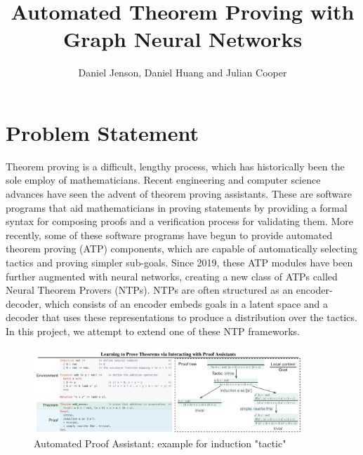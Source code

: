 \documentclass{article}
\title{%
    Automated Theorem Proving with Graph Neural Networks}
\author{Daniel Jenson, Daniel Huang and Julian Cooper}
\begin{document}
\maketitle



\vspace{-3em}
\section{Problem Statement}
Theorem proving is a difficult, lengthy process, which has historically been the sole employ of mathematicians. Recent engineering and computer science advances have seen the advent of theorem proving assistants. These are software programs that aid mathematicians in proving statements by providing a formal syntax for composing proofs and a verification process for validating them. More recently, some of these software programs have begun to provide automated theorem proving (ATP) components, which are capable of automatically selecting tactics and proving simpler sub-goals. Since 2019, these ATP modules have been further augmented with neural networks, creating a new class of ATPs called Neural Theorem Provers (NTPs). NTPs are often structured as an encoder-decoder, which consists of an encoder embeds goals in a latent space and a decoder that uses these representations to produce a distribution over the tactics. In this project, we attempt to extend one of these NTP frameworks.

\begin{figure}[h]
    \centering
    \includegraphics[width=0.9\textwidth]{images/proof_assistant_example.png}
    \caption{Automated Proof Assistant: example for induction "tactic" \cite{coqgym}}
    \label{fig:atp}
\end{figure}
\end{document}
